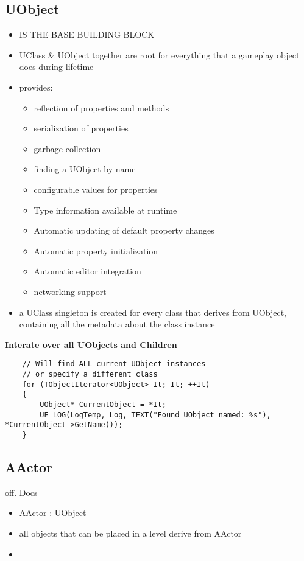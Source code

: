         \subsection{UObject}
            \begin{itemize}
                \item IS THE BASE BUILDING BLOCK
                \item UClass \& UObject together are root for everything that a gameplay object does during lifetime
                \item provides:
                \begin{itemize}
                    \item reflection of properties and methods
                    \item serialization of properties
                    \item garbage collection
                    \item finding a UObject by name
                    \item configurable values for properties
                    \item Type information available at runtime 
                    \item Automatic updating of default property changes
                    \item Automatic property initialization
                    \item Automatic editor integration
                    \item networking support
                \end{itemize}
                \item a UClass singleton is created for every class that derives from UObject, containing all the metadata about the class instance
            \end{itemize}
            \uline{\textbf{Interate over all UObjects and Children}}
            \begin{lstlisting}
    // Will find ALL current UObject instances
    // or specify a different class
    for (TObjectIterator<UObject> It; It; ++It)
    {
        UObject* CurrentObject = *It;
        UE_LOG(LogTemp, Log, TEXT("Found UObject named: %s"), *CurrentObject->GetName());
    }
            \end{lstlisting}

        \subsection{AActor}
            \href{https://docs.unrealengine.com/4.27/en-US/ProgrammingAndScripting/ProgrammingWithCPP/UnrealArchitecture/Actors/}{off. Docs}
            \begin{itemize}
                \item AActor : UObject
                \item all objects that can be placed in a level derive from AActor
                \item 
            \end{itemize}


